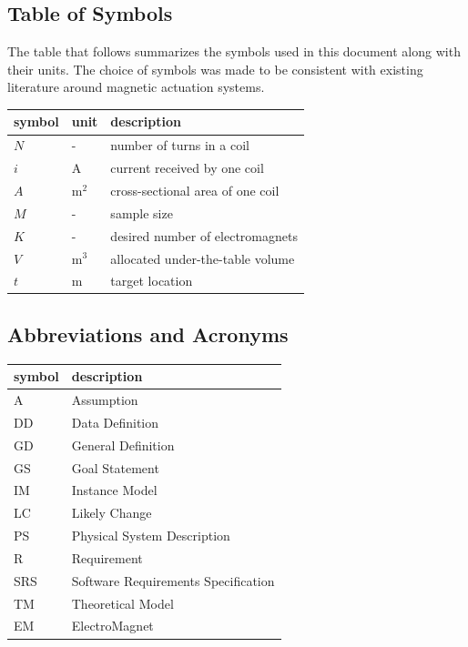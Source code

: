 \documentclass[12pt]{article}
\begin{document}
\subsection{Table of Symbols}

The table that follows summarizes the symbols used in this document along with
their units.  The choice of symbols was made to be consistent with existing literature around magnetic actuation systems.

\renewcommand{\arraystretch}{1.2}
\noindent \begin{longtable*}{l l p{12cm}} \toprule
\textbf{symbol} & \textbf{unit} & \textbf{description}\\
\midrule 
$N$ & - & number of turns in a coil
\\
$i$ & \si{\ampere} & current received by one coil
\\
$A$ & \si{\metre}$^2$ & cross-sectional area of one coil
\\
$M$ & - & sample size
\\
$K$ & - & desired number of electromagnets 
\\
$V$ & \si{\metre}$^3$ & allocated under-the-table volume
\\
$t$ & \si{\metre} & target location
\\
\bottomrule
\end{longtable*}


\subsection{Abbreviations and Acronyms}

\renewcommand{\arraystretch}{1.2}
\begin{tabular}{l l} 
  \toprule		
  \textbf{symbol} & \textbf{description}\\
  \midrule 
  A & Assumption\\
  DD & Data Definition\\
  GD & General Definition\\
  GS & Goal Statement\\
  IM & Instance Model\\
  LC & Likely Change\\
  PS & Physical System Description\\
  R & Requirement\\
  SRS & Software Requirements Specification\\
  TM & Theoretical Model\\
  EM & ElectroMagnet \\
  \bottomrule
\end{tabular}\\
\end{document}
